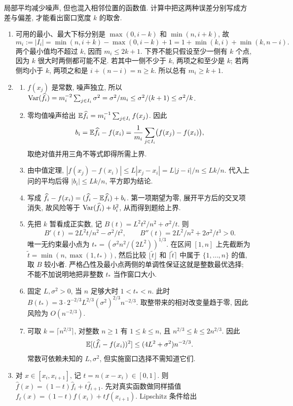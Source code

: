 \begin{solution}
局部平均减少噪声, 但也混入相邻位置的函数值. 计算中把这两种误差分别写成方差与偏差, 才能看出窗口宽度 $k$ 的取舍.
\begin{enumerate}[label=\arabic*.]
\item 可用的最小、最大下标分别是 $\max(0,i-k)$ 和 $\min(n,i+k)$, 故
\[
m_i:=|I_i|=\min(n,i+k)-\max(0,i-k)+1
=1+\min(k,i)+\min(k,n-i).
\]
两个最小值均不超过 $k$, 因而 $m_i\le2k+1$. 下界不能只假设至少一侧有 $k$ 个点, 因为 $k$ 很大时两侧都可能不足. 若其中一侧不少于 $k$, 两项之和至少是 $k$; 若两侧均小于 $k$, 两项之和是 $i+(n-i)=n\ge k$. 所以总有 $m_i\ge k+1$.
\item
\begin{enumerate}[label=\alph*)]
\item $f(x_j)$ 是常数, 噪声独立, 所以 $\operatorname{Var}(\widehat f_i)=m_i^{-2}\sum_{j\in I_i}\sigma^2=\sigma^2/m_i\le\sigma^2/(k+1)\le\sigma^2/k$.
\item 零均值噪声给出 $\mathbb E\widehat f_i=m_i^{-1}\sum_{j\in I_i}f(x_j)$. 因此
\[
b_i=\mathbb E\widehat f_i-f(x_i)
=\frac1{m_i}\sum_{j\in I_i}\bigl(f(x_j)-f(x_i)\bigr),
\]
取绝对值并用三角不等式即得所需上界.
\item 由中值定理, $|f(x_j)-f(x_i)|\le L|x_j-x_i|=L|j-i|/n\le Lk/n$. 代入上问的平均后得 $|b_i|\le Lk/n$, 平方即为结论.
\item 写成 $\widehat f_i-f(x_i)=(\widehat f_i-\mathbb E\widehat f_i)+b_i$. 第一项期望为零, 展开平方后的交叉项消失, 故风险等于 $\operatorname{Var}(\widehat f_i)+b_i^2$, 从而得到题给上界.
\item 先把 $k$ 暂看成正实数, 记 $B(t)=L^2t^2/n^2+\sigma^2/t$. 则
\[
B'(t)=2L^2t/n^2-\sigma^2/t^2,\qquad
B''(t)=2L^2/n^2+2\sigma^2/t^3>0.
\]
唯一无约束最小点为 $t_*=(\sigma^2n^2/(2L^2))^{1/3}$. 在区间 $[1,n]$ 上先截断为 $\widetilde t=\min(n,\max(1,t_*))$, 然后比较 $\lfloor\widetilde t\rfloor$ 和 $\lceil\widetilde t\rceil$ 中属于 $\{1,\ldots,n\}$ 的值, 取 $B$ 较小者. 严格凸性及最小点两侧的单调性保证这就是整数最优选择; 不能不加说明地把非整数 $t_*$ 当作窗口大小.
\item 固定 $L,\sigma^2>0$, 当 $n$ 足够大时 $1<t_*<n$. 此时 $B(t_*)=3\cdot2^{-2/3}L^{2/3}(\sigma^2)^{2/3}n^{-2/3}$. 取整带来的相对改变量趋于零, 因此风险为 $O(n^{-2/3})$.
\item 可取 $k=\lceil n^{2/3}\rceil$, 对整数 $n\ge1$ 有 $1\le k\le n$, 且 $n^{2/3}\le k\le2n^{2/3}$. 因此
\[
\mathbb E[(\widehat f_i-f(x_i))^2]
\le(4L^2+\sigma^2)n^{-2/3}.
\]
常数可依赖未知的 $L,\sigma^2$, 但实施窗口选择不需知道它们.
\end{enumerate}
\item 对 $x\in[x_i,x_{i+1}]$, 记 $t=n(x-x_i)\in[0,1]$. 则 $\widehat f(x)=(1-t)\widehat f_i+t\widehat f_{i+1}$. 先对真实函数做同样插值 $f_\ell(x)=(1-t)f(x_i)+tf(x_{i+1})$. Lipschitz 条件给出

\end{enumerate}
\end{solution}
